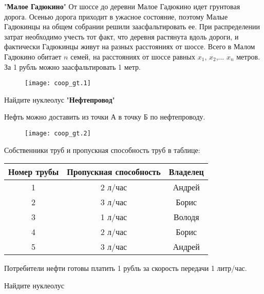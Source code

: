  "\textbf{Малое Гадюкино}"
От шоссе до деревни Малое Гадюкино идет грунтовая дорога. Осенью дорога приходит в ужасное состояние, поэтому Малые Гадюкинцы на общем собрании решили заасфальтировать ее. При распределении затрат необходимо учесть тот факт, что деревня растянута вдоль дороги, и фактически Гадюкинцы живут на разных расстояниях от шоссе. Всего в Малом Гадюкино обитает  $n$  семей, на расстояниях от шоссе равных  $x_{1}$,  $x_{2}$,...  $x_{n}$ метров. За 1 рубль можно заасфальтировать 1 метр.


\begin{figure}[htbp]
    \texttt{[image: coop\_gt.1]}
\end{figure}


Найдите нуклеолус
 "\textbf{Нефтепровод}"

Нефть можно доставить из точки А в точку Б по нефтепроводу. 

\begin{figure}[htbp]
    \texttt{[image: coop\_gt.2]}
\end{figure}

Собственники труб и пропускная способность труб в таблице:

\begin{tabular}{|c|c|c|}

\hline 
Номер трубы & Пропускная способность & Владелец \\
\hline
1 & 2 л/час & Андрей \\
2 & 3 л/час & Борис \\
3 & 1 л/час & Володя \\
4 & 2 л/час & Борис \\
5 & 3 л/час & Андрей \\
\hline
\end{tabular}

Потребители нефти готовы платить 1 рубль за скорость передачи 1 литр/час. 

Найдите нуклеолус

